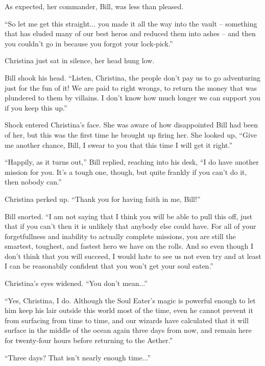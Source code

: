 \documentclass[showtrims,b6paper,draft,10pt]{memoir}
\begin{document}
\timeskip

As expected, her commander, Bill, was less than pleased.

``So let me get this straight... you made it all the way into the vault -- something that has eluded many of our best heros and reduced them into ashes -- and then you couldn't go in because you forgot your lock-pick.''

Christina just sat in silence, her head hung low.

Bill shook his head.  ``Listen, Christina, the people don't pay us to go adventuring just for the fun of it!  We are paid to right wrongs, to return the money that was plundered to them by villains.  I don't know how much longer we can support you if you keep this up.''

Shock entered Christina's face.  She was aware of how disappointed Bill had been of her, but this was the first time he brought up firing her.  She looked up,  ``Give me another chance, Bill, I swear to you that this time I will get it right.''

``Happily, as it turns out,'' Bill replied, reaching into his desk, ``I do have another mission for you.  It's a tough one, though, but quite frankly if you can't do it, then nobody can.''

Christina perked up.  ``Thank you for having faith in me, Bill!''

Bill snorted.  ``I am not saying that I think you will be able to pull this off, just that if you can't then it is unlikely that anybody else could have.  For all of your forgetfullness and inability to actually complete missions, you are still the smartest, toughest, and fastest hero we have on the rolls.  And so even though I don't think that you will succeed, I would hate to see us not even try and at least I can be reasonabily confident that you won't get your soul eaten.''

Christina's eyes widened.  ``You don't mean...''

``Yes, Christina, I do.  Although the Soul Eater's magic is powerful enough to let him keep his lair outside this world most of the time, even he cannot prevent it from surfacing from time to time, and our wizards have calculated that it will surface in the middle of the ocean again three days from now, and remain here for twenty-four hours before returning to the Aether.''

``Three days?  That isn't nearly enough time...''
\end{document}
